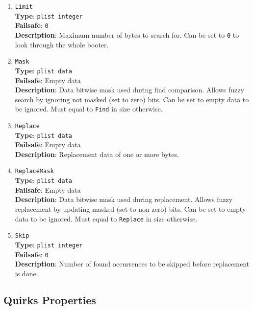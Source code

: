 \documentclass[]{article}
\begin{document}
\begin{enumerate}
\item
  \texttt{Limit}\\
  \textbf{Type}: \texttt{plist\ integer}\\
  \textbf{Failsafe}: \texttt{0}\\
  \textbf{Description}: Maximum number of bytes to search for. Can be set to
  \texttt{0} to look through the whole booter.

\item
  \texttt{Mask}\\
  \textbf{Type}: \texttt{plist\ data}\\
  \textbf{Failsafe}: Empty data\\
  \textbf{Description}: Data bitwise mask used during find comparison.
  Allows fuzzy search by ignoring not masked (set to zero) bits. Can be
  set to empty data to be ignored. Must equal to \texttt{Find} in size
  otherwise.

\item
  \texttt{Replace}\\
  \textbf{Type}: \texttt{plist\ data}\\
  \textbf{Failsafe}: Empty data\\
  \textbf{Description}: Replacement data of one or more bytes.

\item
  \texttt{ReplaceMask}\\
  \textbf{Type}: \texttt{plist\ data}\\
  \textbf{Failsafe}: Empty data\\
  \textbf{Description}: Data bitwise mask used during replacement.
  Allows fuzzy replacement by updating masked (set to non-zero) bits. Can be
  set to empty data to be ignored. Must equal to \texttt{Replace} in size
  otherwise.

\item
  \texttt{Skip}\\
  \textbf{Type}: \texttt{plist\ integer}\\
  \textbf{Failsafe}: \texttt{0}\\
  \textbf{Description}: Number of found occurrences to be skipped before replacement
  is done.

\end{enumerate}

\subsection{Quirks Properties}\label{booterpropsquirks}
\end{document}

